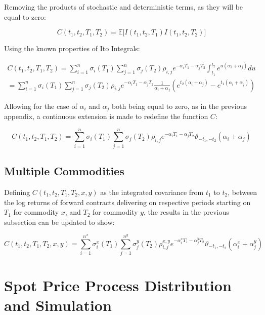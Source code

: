 \documentclass{article}
\begin{document}
Removing the products of stochastic and deterministic terms, as they will be equal to zero:

\begin{equation}
    C(t_1, t_2, T_1, T_2) = \mathbb{E}\bigl[ I(t_1, t_2, T_1) I(t_1, t_2, T_2) \bigr] 
\end{equation}

Using the known properties of Ito Integrals:

\begin{eqnarray}
    \nonumber
    C(t_1, t_2, T_1, T_2) = \sum_{i=1}^n \sigma_i(T_1) \sum_{j=1}^n 
    \sigma_j(T_2) \rho_{i,j} e^{-\alpha_i T_1 -\alpha_j T_2} 
    \int_{t_1}^{t_2} e^{u(\alpha_i + \alpha_j)} du \\
    = \sum_{i=1}^n \sigma_i(T_1) \sum_{j=1}^n \sigma_j(T_2) \rho_{i,j} 
    e^{-\alpha_i T_1 -\alpha_j T_2} \frac{1}{\alpha_i + \alpha_j}
    (e^{t_2(\alpha_i + \alpha_j)} - e^{t_1(\alpha_i + \alpha_j)} )
\end{eqnarray}

Allowing for the case of $\alpha_i$ and $\alpha_j$ both being equal to zero, 
as in the previous appendix, a continuous extension is made to redefine the function
$C$:

\begin{equation}
    C(t_1, t_2, T_1, T_2) = \sum_{i=1}^n \sigma_i(T_1) \sum_{j=1}^n \sigma_j(T_2) \rho_{i,j} 
    e^{-\alpha_i T_1 -\alpha_j T_2} \vartheta_{-t_1, -t_2}(\alpha_i + \alpha_j)
\end{equation}

\subsection{Multiple Commodities}
Defining $C(t_1, t_2, T_1, T_2, x, y)$
as the integrated covariance from $t_1$ to $t_2$, between the log returns of forward 
contracts delivering on respective periods starting on $T_1$ for commodity $x$,
and $T_2$ for commodity $y$, the results in the previous subsection can be updated
to show:

\begin{equation}
    C(t_1, t_2, T_1, T_2, x, y) = \sum_{i=1}^{n^x} \sigma_i^x(T_1) \sum_{j=1}^{n^y} 
    \sigma_j^y(T_2) \rho_{i,j}^{x, y} 
    e^{-\alpha_i^x T_1 -\alpha_j^y T_2} \vartheta_{-t_1, -t_2}(\alpha_i^x + \alpha_j^y)
\end{equation}


\section{Spot Price Process Distribution and Simulation}
\label{appendix:spot_distribution}
\end{document}
